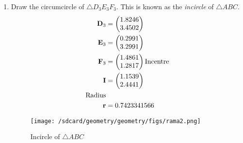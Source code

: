 \documentclass[11pt]{book}
\begin{document}
\begin{enumerate}[label=\thesection.\arabic*.,ref=\thesection.\theenumi]
\item Draw the circumcircle of $\triangle D_3E_3F_3$.  This is known as the {\em incircle} of $\triangle ABC$. \\
\solution 
\begin{align}
    \mathbf{D}_3 &= \begin{pmatrix}1.8246  \\ 3.4502\end{pmatrix} \\
    \mathbf{E}_3 &= \begin{pmatrix}0.2991  \\ 3.2991\end{pmatrix} \\
    \mathbf{F}_3 &= \begin{pmatrix}1.4861  \\ 1.2817\end{pmatrix} 
\text{Incentre}\\ 
    \mathbf{I} &= \begin{pmatrix}1.1539 \\ 2.4441\end{pmatrix} \\
\text{Radius}\\
 \mathbf{r} &=  0.7423341566
\end{align}
\begin{figure}[H]
\texttt{[image: /sdcard/geometry/geometry/figs/rama2.png]}
\caption{Incircle of $\triangle ABC$}
\label{fig:fig3}
\end{figure}
  

\end{enumerate}
\end{document}

